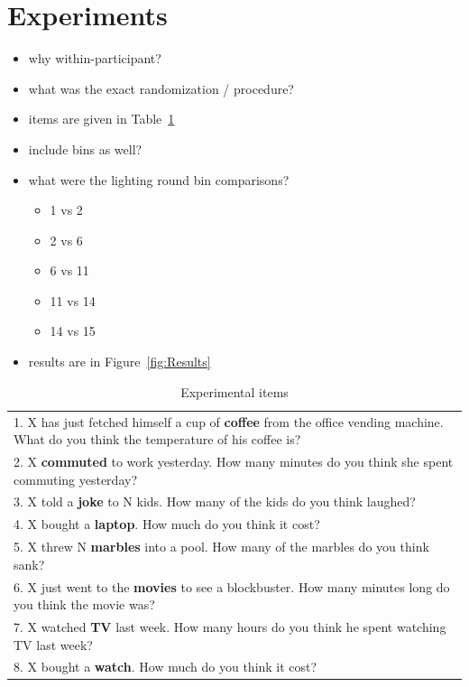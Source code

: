 \documentclass[10pt,letterpaper]{article}
\begin{document}
\section{Experiments}

\begin{itemize}
\item why within-participant?
\item what was the exact randomization / procedure?
\item items are given in Table~\ref{tab:Items}
\item include bins as well?
\item what were the lighting round bin comparisons?
  \begin{itemize}
  \item 1 vs 2
  \item 2 vs 6
  \item 6 vs 11
  \item 11 vs 14
  \item 14 vs 15
  \end{itemize}
\item results are in Figure~\ref{fig:Results}
\end{itemize}

\begin{table}
  \centering
  \begin{tabular}{p{8cm}}
    1.  X has just fetched himself a cup of \textbf{coffee} from the office vending machine.
         What do you think the temperature of his coffee is?  \\
    2.  X \textbf{commuted} to work yesterday. 
        How many minutes do you think she spent commuting yesterday? \\
3.  X told a \textbf{joke} to N kids. 
    How many of the kids do you think laughed?\\
    
4.  X bought a \textbf{laptop}.    
    How much do you think it cost?\\
    
5.  X threw N \textbf{marbles} into a pool.
    How many of the marbles do you think sank?\\

6.  X just went to the \textbf{movies} to see a blockbuster.
    How many minutes long do you think the movie was?\\

7.  X watched \textbf{TV} last week.
    How many hours do you think he spent watching TV last week? \\

8.  X bought a \textbf{watch}.
    How much do you think it cost?
  \end{tabular}
  \caption{Experimental items}
  \label{tab:Items}
\end{table}
\end{document}
